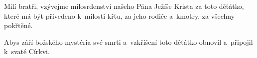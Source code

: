  Milí bratři, vzývejme milosrdenství našeho Pána Ježíše
Krista za toto děťátko, které má být přivedeno k~milosti křtu, za jeho rodiče
a~kmotry, za všechny pokřtěné.

 Abys září božského mystéria své smr\-ti a~vzkříšení toto
děťátko obnovil a~připojil k~svaté Církvi.
